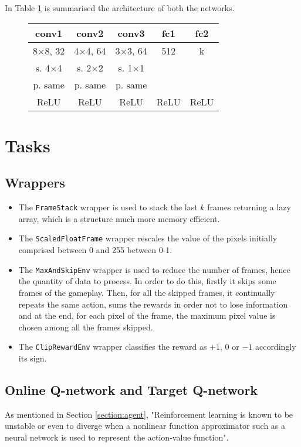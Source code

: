 \documentclass[a4paper,12pt]{article} %
\begin{document}
	In Table \ref{tab:arc} is summarised the architecture of both the networks. 
	
	\begin{figure}[htb]
		\centering
		
		\begin{tabular}{ccccc}
			\toprule
			\textbf{conv1} & \textbf{conv2} & \textbf{conv3} & \textbf{fc1} &
			\textbf{fc2} \\
			\midrule
			8$\times$8,  32 & 4$\times$4, 64 & 3$\times$3, 64 & 512 & k\\
			s. 4$\times$4 &   s. 2$\times$2 &   s. 1$\times$1 &  & \\
			p. same & p. same & p. same &&\\
			ReLU & ReLU & ReLU & ReLU & ReLU  \\
			\bottomrule
		\end{tabular}
		\label{tab:arc}
	\end{figure}
	
	\section{Tasks}
	\label{section:tasks}
	
	\subsection*{Wrappers}
	\begin{itemize}
		\item The \texttt{FrameStack} wrapper is used to stack the last $k$ frames returning a lazy array, which is a structure much more memory efficient.
		\item The \texttt{ScaledFloatFrame} wrapper rescales the value of the pixels initially comprised between 0 and 255 between 0-1.
		\item The \texttt{MaxAndSkipEnv} wrapper is used to reduce the number of frames, hence the quantity of data to process. In order to do this, firstly it skips some frames of the gameplay. Then, for all the skipped frames, it continually repeats the same action, sums the rewards in order not to lose information and at the end, for each pixel of the frame, the maximum pixel value is chosen among all the frames skipped.
		\item The \texttt{ClipRewardEnv} wrapper classifies the reward as $+1$, $0$ or $-1$ accordingly its sign.
	\end{itemize}
	
	
	\subsection*{Online Q-network and Target Q-network}	
	As mentioned in Section \ref{section:agent}, "Reinforcement learning is known to be unstable or even to diverge when a nonlinear function approximator such as a neural network is used to represent the action-value function".
	
\end{document}
